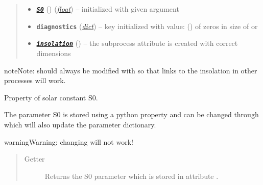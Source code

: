 \documentclass[a4paper,10pt,english]{sphinxmanual}
\begin{document}
\begin{fulllineitems}
\begin{quote}
\begin{description}
\begin{itemize}
\item {} 
{\hyperref[api/climlab.radiation:climlab.radiation.insolation._Insolation.S0]{\emph{\textbf{\texttt{S0}}}}} () (\href{http://docs.python.org/2.7/library/functions.html\#float}{\emph{float}}) -- initialized with given argument 

\item {} 
\textbf{\texttt{diagnostics}} (\href{http://docs.python.org/2.7/library/stdtypes.html\#dict}{\emph{dict}}) -- key  initialized with value:
{\hyperref[api/climlab.domain:climlab.domain.field.Field]{\emph{}}} () of zeros
in size of  or

\item {} 
{\hyperref[api/climlab.radiation:module\string-climlab.radiation.insolation]{\emph{\textbf{\texttt{insolation}}}}} () -- the subprocess attribute  is
created with correct dimensions

\end{itemize}

\end{description}\end{quote}

\begin{notice}{note}{Note:}
 should always be modified with 
 so that links to the insolation in other
processes will work.
\end{notice}

\begin{fulllineitems}
\label{api/climlab.radiation:climlab.radiation.insolation._Insolation.S0}
Property of solar constant S0.

The parameter S0 is stored using a python property and can be changed through 
 which will also update the parameter dictionary.

\begin{notice}{warning}{Warning:}
changing  will not work!
\end{notice}
\begin{quote}\begin{description}
\item[{Getter}] \leavevmode
Returns the S0 parameter which is stored in attribute .


\end{description}
\end{quote}
\end{fulllineitems}
\end{fulllineitems}
\end{document}
